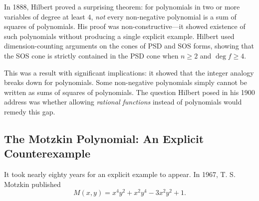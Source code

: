 In 1888, Hilbert proved a surprising theorem: for polynomials in two or more variables of degree at least $4$, \emph{not} every non-negative polynomial is a sum of squares of polynomials. His proof was non-constructive---it showed existence of such polynomials without producing a single explicit example. Hilbert used dimension-counting arguments on the cones of PSD and SOS forms, showing that the SOS cone is strictly contained in the PSD cone when $n \geq 2$ and $\deg f \geq 4$.

This was a result with significant implications: it showed that the integer analogy breaks down for polynomials. Some non-negative polynomials simply cannot be written as sums of squares of polynomials. The question Hilbert posed in his 1900 address was whether allowing \emph{rational functions} instead of polynomials would remedy this gap.

\subsection{The Motzkin Polynomial: An Explicit Counterexample}

It took nearly eighty years for an explicit example to appear. In 1967, T. S. Motzkin published
\[
    M(x,y) = x^4 y^2 + x^2 y^4 - 3x^2 y^2 + 1.
\]

